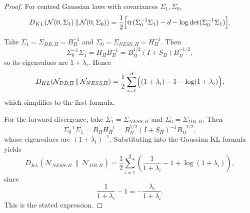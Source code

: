 \documentclass[11pt,a4paper]{article}
\numberwithin{equation}{section}
\theoremstyle{thmcompact}
\theoremstyle{remark}
\begin{document}
\begin{proof}
For centred Gaussian laws with covariances \(\Sigma_1,\Sigma_0\),
\begin{equation}
D_{KL}\!\left(\mathcal N(0,\Sigma_1)\,\|\,\mathcal N(0,\Sigma_0)\right)
=
\frac12\Bigl[
\operatorname{tr}(\Sigma_0^{-1}\Sigma_1)-d-\log\det(\Sigma_0^{-1}\Sigma_1)
\Bigr].
\end{equation}

Take \(\Sigma_1=\Sigma_{DB,\Pi}=B_\Pi^{-1}\) and \(\Sigma_0=\Sigma_{NESS,\Pi}=H_\Pi^{-1}\). Then
\begin{equation}
\Sigma_0^{-1}\Sigma_1
=
H_\Pi B_\Pi^{-1}
=
B_\Pi^{1/2}(I+S_\Pi)B_\Pi^{-1/2},
\end{equation}
so its eigenvalues are \(1+\lambda_i\). Hence
\begin{equation}
D_{KL}\!\left(\mathcal N_{DB,\Pi}\,\|\,\mathcal N_{NESS,\Pi}\right)
=
\frac12\sum_{i=1}^{d}\Bigl((1+\lambda_i)-1-\log(1+\lambda_i)\Bigr),
\end{equation}
which simplifies to the first formula.

For the forward divergence, take \(\Sigma_1=\Sigma_{NESS,\Pi}\) and \(\Sigma_0=\Sigma_{DB,\Pi}\). Then
\begin{equation}
\Sigma_0^{-1}\Sigma_1
=
B_\Pi H_\Pi^{-1}
=
B_\Pi^{1/2}(I+S_\Pi)^{-1}B_\Pi^{-1/2},
\end{equation}
whose eigenvalues are \((1+\lambda_i)^{-1}\). Substituting into the Gaussian KL formula yields
\begin{equation}
D_{KL}\!\left(\mathcal N_{NESS,\Pi}\,\|\,\mathcal N_{DB,\Pi}\right)
=
\frac12\sum_{i=1}^{d}
\left(
\frac{1}{1+\lambda_i}-1+\log(1+\lambda_i)
\right),
\end{equation}
since
\begin{equation}
\frac{1}{1+\lambda_i}-1=-\frac{\lambda_i}{1+\lambda_i}.
\end{equation}
This is the stated expression.


\end{proof}
\end{document}
